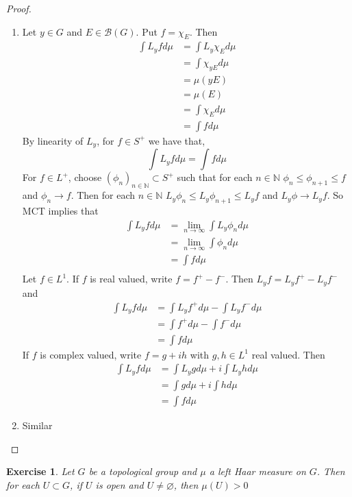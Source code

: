 \documentclass[12pt]{amsart}
\newtheorem{ex}[thm]{Exercise}
\newcommand{\N}{\mathbb{N}}
\newcommand{\MB}{\mathcal{B}}
\newcommand{\limn}{\lim \limits_{n \rightarrow \infty}}
\newcommand{\seq}[2]{(#1_{#2})_{#2 \in \N}}
\begin{document}
	\begin{proof}\
		\begin{enumerate}
			\item Let $y \in G$ and $E \in \MB(G)$. Put $f = \chi_E$. Then 
			\begin{align*}
				\int L_y f d \mu 
				& = \int L_y\chi_E d \mu \\
				& =  \int \chi_{yE} d\mu \\
				& = \mu(yE) \\
				& = \mu(E) \\
				& = \int \chi_E d\mu \\
				& = \int f d \mu
			\end{align*} 
			By linearity of $L_y$, for $f \in S^+$ we have that, $$\int L_y f d \mu = \int f d \mu$$ For $f \in L^+$, choose $\seq{\phi}{n} \subset S^+$ such that for each $n \in \N$ $\phi_n \leq \phi_{n+1} \leq f$ and $\phi_n \rightarrow f$. Then for each $n \in \N$ $L_y \phi_n \leq L_y \phi_{n+1} \leq L_y f$ and $L_y \phi \rightarrow L_y f$. So MCT implies that 
			\begin{align*}
				\int L_y f d \mu 
				& = \limn \int L_y \phi_n d \mu \\
				& = \limn \int \phi_n d \mu \\
				& = \int f d \mu \\
			\end{align*}
			Let $f \in L^1$. If $f$ is real valued, write $f = f^+ - f^-$. Then $L_y f = L_y f^+ - L_y f^-$ and 
			\begin{align*}
				\int L_yf d \mu 
				& = \int L_y f^+ d \mu - \int L_y f^- d \mu \\
				& = \int f^+ d \mu - \int f^- d \mu \\
				& = \int f d \mu
			\end{align*}
			If $f$ is complex valued, write $f = g + ih$ with $g, h \in L^1$ real valued. Then 
			\begin{align*}
				\int L_yf d \mu 
				& = \int L_y g d \mu + i \int L_y h d \mu \\
				& = \int g d \mu +i \int h d \mu \\
				& = \int f d \mu
			\end{align*}
			\item Similar
		\end{enumerate}
	\end{proof}
	
	\begin{ex}
		Let $G$ be a topological group and $\mu$ a left Haar measure on $G$. Then for each $U \subset G$, if $U$ is open and $U \neq \varnothing$, then $\mu(U) > 0$
	\end{ex}
\end{document}
